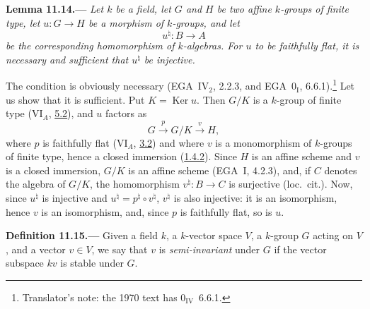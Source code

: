 \medskip
{}\label{lem:sga3-VIB-11.14}%
\noindent\textbf{Lemma 11.14.---}
\emph{Let \(k\) be a field, let \(G\) and \(H\) be two affine
\(k\)-groups of finite type, let \(u:G\to H\) be a morphism of
\(k\)-groups, and let}
\[
  u^\natural:B\longrightarrow A
\]
\emph{be the corresponding homomorphism of \(k\)-algebras. For
\(u\) to be faithfully flat, it is necessary and sufficient that
\(u^\natural\) be injective.}

The condition is obviously necessary \textup{(EGA~IV\(_2\),
2.2.3, and EGA~0\(_{\mathrm I}\), 6.6.1)}.\footnote{Translator's
note: the 1970 text has 0\(_{\mathrm{IV}}\)~6.6.1.} Let us show
that it is sufficient. Put \(K=\operatorname{Ker}u\). Then
\(G/K\) is a \(k\)-group of finite type
\textup{(VI\(_A\), \hyperref[par:sga3-VIA-5.2]{5.2})}, and \(u\)
factors as
\[
  G\xrightarrow{\ p\ }G/K\xrightarrow{\ v\ }H,
\]
where \(p\) is faithfully flat
\textup{(VI\(_A\), \hyperref[thm:sga3-VIA-3.2]{3.2})} and where
\(v\) is a monomorphism of \(k\)-groups of finite type, hence a
closed immersion \textup{(\hyperref[cor:sga3-VIB-1.4.2]{1.4.2})}.
Since \(H\) is an affine scheme and \(v\) is a closed immersion,
\(G/K\) is an affine scheme \textup{(EGA~I, 4.2.3)}, and, if
\(C\) denotes the algebra of \(G/K\), the homomorphism
\(v^\natural:B\to C\) is surjective \textup{(loc.\ cit.)}. Now,
since \(u^\natural\) is injective and
\(u^\natural=p^\natural\circ v^\natural\), \(v^\natural\) is also
injective: it is an isomorphism, hence \(v\) is an isomorphism,
and, since \(p\) is faithfully flat, so is \(u\).

\medskip
{}\label{def:sga3-VIB-11.15}%
\noindent\textbf{Definition 11.15.---}
Given a field \(k\), a \(k\)-vector space \(V\), a \(k\)-group
\(G\) acting on \(V\), and a vector \(v\in V\), we say that \(v\)
is \emph{semi-invariant} under \(G\) if the vector subspace
\(kv\) is stable under \(G\).

